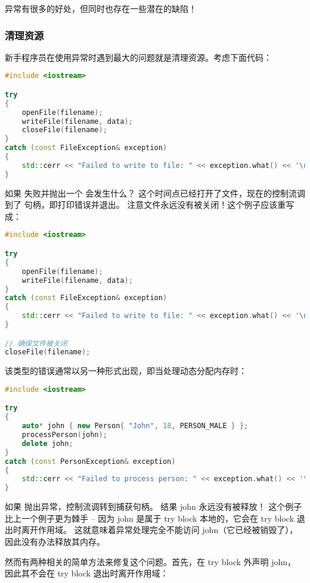 \documentclass[../../LearnCpp.tex]{subfiles}
\begin{document}

异常有很多的好处，但同时也存在一些潜在的缺陷！

\subsubsection*{清理资源}

新手程序员在使用异常时遇到最大的问题就是清理资源。考虑下面代码：

\begin{lstlisting}[language=C++]
#include <iostream>

try
{
    openFile(filename);
    writeFile(filename, data);
    closeFile(filename);
}
catch (const FileException& exception)
{
    std::cerr << "Failed to write to file: " << exception.what() << '\n';
}
\end{lstlisting}

如果  失败并抛出一个  会发生什么？
这个时间点已经打开了文件，现在的控制流调到了  句柄，即打印错误并退出。
注意文件永远没有被关闭！这个例子应该重写成：

\begin{lstlisting}[language=C++]
#include <iostream>

try
{
    openFile(filename);
    writeFile(filename, data);
}
catch (const FileException& exception)
{
    std::cerr << "Failed to write to file: " << exception.what() << '\n';
}

// 确保文件被关闭
closeFile(filename);
\end{lstlisting}

该类型的错误通常以另一种形式出现，即当处理动态分配内存时：

\begin{lstlisting}[language=C++]
#include <iostream>

try
{
    auto* john { new Person{ "John", 18, PERSON_MALE } };
    processPerson(john);
    delete john;
}
catch (const PersonException& exception)
{
    std::cerr << "Failed to process person: " << exception.what() << '\n';
}
\end{lstlisting}

如果  抛出异常，控制流调转到捕获句柄。
结果 john 永远没有被释放！
这个例子比上一个例子更为棘手 --
因为 john 是属于 try block 本地的，它会在 try block 退出时离开作用域。
这就意味着异常处理完全不能访问 john（它已经被销毁了），因此没有办法释放其内存。

然而有两种相关的简单方法来修复这个问题。首先，在 try block 外声明 john，
因此其不会在 try block 退出时离开作用域：
\end{document}
